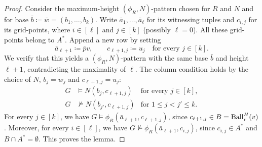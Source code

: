 \begin{proof}
    Consider the maximum-height $(\phi_R,N)$-pattern chosen for $R$ and $N$ and for  base $\bar b\coloneqq\bar w=(b_1,\ldots,b_k)$.
    Write $\bar a_1,\ldots,\bar a_\ell$ for its witnessing tuples and $c_{i,j}$ for its grid-points, where $i\in[\ell]$ and $j\in[k]$ (possibly $\ell=0$).
    All these grid-points belong to $A^*$.
    Append a new row by setting
    \[
        \bar a_{\ell+1}\coloneqq\bar p v,
        \qquad
        c_{\ell+1,j}\coloneqq u_j\quad\text{for every }j\in[k].
    \]
    We verify that this yields a $(\phi_R,N)$-pattern with the same base $\bar b$ and height $\ell+1$, contradicting the maximality of $\ell$.        
    The column condition holds by the choice of $N$, $b_j=w_j$ and $c_{\ell+1,j}=u_j$:
    \[
        \begin{aligned}
            G&\models N(b_j,c_{\ell+1,j})&\text{for every }j\in[k],\\
            G&\not\models N(b_{j'},c_{\ell+1,j})&\text{for }1\le j<j'\le k.
        \end{aligned}
    \]    
    For every $j\in[k]$, we have $G\models\phi_R(\bar a_{\ell+1},c_{\ell+1,j})$, since $c_{\ell+1,j}\in B=\operatorname{Ball}_r^H(v)$.
    Moreover, for every $i\in[\ell]$, we have $G\not\models\phi_R(\bar a_{\ell+1},c_{i,j})$, since $c_{i,j}\in A^*$ and $B\cap A^*=\emptyset$. This proves the lemma.
\end{proof}



